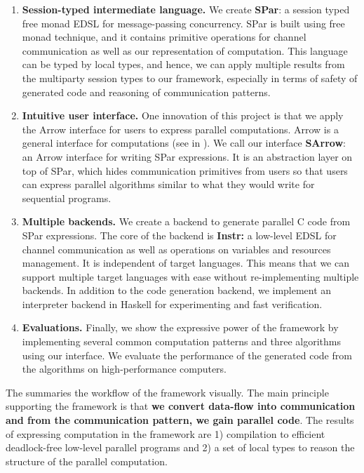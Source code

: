 \begin{enumerate}
    \item \textbf{Session-typed intermediate language. } We create \textbf{SPar}: a session typed free monad EDSL for message-passing concurrency. SPar is built using free monad technique, and it contains primitive operations for channel communication as well as our representation of computation. This language can be typed by local types, and hence, we can apply multiple results from the multiparty session types to our framework, especially in terms of safety of generated code and reasoning of communication patterns.
    \item \textbf{Intuitive user interface. } One innovation of this project is that we apply the Arrow interface for users to express parallel computations. Arrow is a general interface for computations (see in ). We call our interface \textbf{SArrow}: an Arrow interface for writing SPar expressions. It is an abstraction layer on top of SPar, which hides communication primitives from users so that users can express parallel algorithms similar to what they would write for sequential programs.
    \item \textbf{Multiple backends. } We create a backend to generate parallel C code from SPar expressions. The core of the backend is \textbf{Instr:} a low-level EDSL for channel communication as well as operations on variables and resources management. It is independent of target languages. This means that we can support multiple target languages with ease without re-implementing multiple backends. In addition to the code generation backend, we implement an interpreter backend in Haskell for experimenting and fast verification.
    \item \textbf{Evaluations. } Finally, we show the expressive power of the framework by implementing several common computation patterns and three algorithms using our interface. We evaluate the performance of the generated code from the algorithms on high-performance computers.
\end{enumerate}
The  summaries the workflow of the framework visually. The main principle supporting the framework is that \textbf{we convert data-flow into communication and from the communication pattern, we gain parallel code}. The results of expressing computation in the framework are 1) compilation to efficient deadlock-free low-level parallel programs and 2) a set of local types to reason the structure of the parallel computation.

